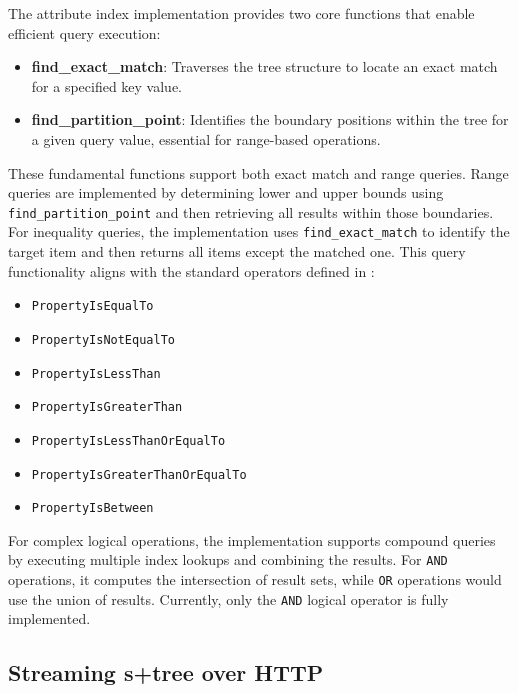 The attribute index implementation provides two core functions that enable efficient query execution:

\begin{itemize}
  \item \textbf{find\_exact\_match}: Traverses the tree structure to locate an exact match for a specified key value.
  \item \textbf{find\_partition\_point}: Identifies the boundary positions within the tree for a given query value, essential for range-based operations.
\end{itemize}

These fundamental functions support both exact match and range queries. Range queries are implemented by determining lower and upper bounds using \texttt{find\_partition\_point} and then retrieving all results within those boundaries. For inequality queries, the implementation uses \texttt{find\_exact\_match} to identify the target item and then returns all items except the matched one. This query functionality aligns with the standard operators defined in \citet{ogc_filter_encoding_2010}:

\begin{itemize}
  \item \texttt{PropertyIsEqualTo}
  \item \texttt{PropertyIsNotEqualTo}
  \item \texttt{PropertyIsLessThan}
  \item \texttt{PropertyIsGreaterThan}
  \item \texttt{PropertyIsLessThanOrEqualTo}
  \item \texttt{PropertyIsGreaterThanOrEqualTo}
  \item \texttt{PropertyIsBetween}
\end{itemize}

For complex logical operations, the implementation supports compound queries by executing multiple index lookups and combining the results. For \texttt{AND} operations, it computes the intersection of result sets, while \texttt{OR} operations would use the union of results. Currently, only the \texttt{AND} logical operator is fully implemented.

\subsection{Streaming \texorpdfstring{\ac{s+tree}}{S+tree} over HTTP}
\label{methodology:attribute_index:streaming_s_tree}

